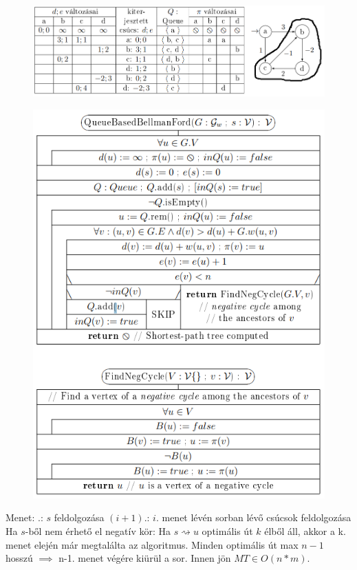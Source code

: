 \documentclass[12pt,a4paper]{article}
\renewcommand{\leadsto}{\rightsquigarrow}
\begin{document}
\begin{figure}[h!]
	\centering
	\includegraphics[width=1\linewidth]{QBF-példa-kör}
\end{figure}

\pagebreak

\begin{figure}[h!]
	\centering
	\includegraphics[width=0.7\linewidth]{QBF}
\end{figure}

\begin{outline}
	\1 Menet:
		.: $s$ feldolgozása
		\2 $(i+1)$.: $i$. menet lévén sorban lévő csúcsok feldolgozása
	\1 Ha $s$-ből nem érhető el negatív kör:
		\2 Ha $s \leadsto u$ optimális út $k$ élből áll, akkor a k. menet elején már megtalálta az algoritmus.
		\2 Minden optimális út max $n-1$ hosszú $\implies$ n-1. menet végére kiürül a sor. Innen jön $MT \in O(n*m)$.
\end{outline}

\pagebreak
\end{document}
